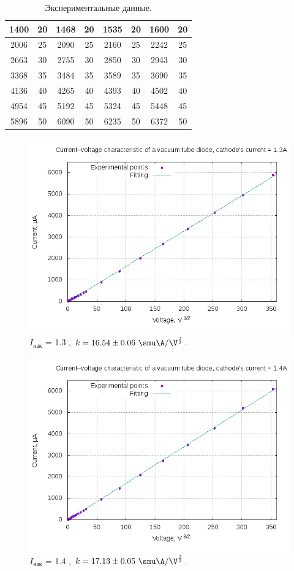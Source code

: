\documentclass{../lab_class}
\begin{document}
\begin{table}[H]
\begin{tabular}{|c|c|c|c|c|c|c|c|}
1400	&20		&1468	&20		&1535	&20		&1600	&20		\\ \hline
2006	&25		&2090	&25		&2160	&25		&2242	&25		\\ \hline
2663	&30		&2755	&30		&2850	&30		&2943	&30		\\ \hline
3368	&35		&3484	&35		&3589	&35		&3690	&35		\\ \hline
4136	&40		&4265	&40		&4393	&40		&4502	&40		\\ \hline
4954	&45		&5192	&45		&5324	&45		&5448	&45		\\ \hline
5896	&50		&6090	&50		&6235	&50		&6372	&50		\\ \hline
\end{tabular}
\caption{Экспериментальные данные.}
\end{table}

\begin{figure}[H]
\centering
\includegraphics[width = 0.87 \textwidth]{graph_i13.png}
\caption{$I_{\text{нак}}$ = 1.3 \A, $k = 16.54 \pm 0.06 \ \smu\A / \V^\frac{3}{2}$.}
\end{figure}

\begin{figure}[H]
\centering
\includegraphics[width = 0.87 \textwidth]{graph_i14.png}
\caption{$I_{\text{нак}}$ = 1.4 \A, $k = 17.13 \pm 0.05 \ \smu\A / \V^\frac{3}{2}$.}
\end{figure}
\end{document}
